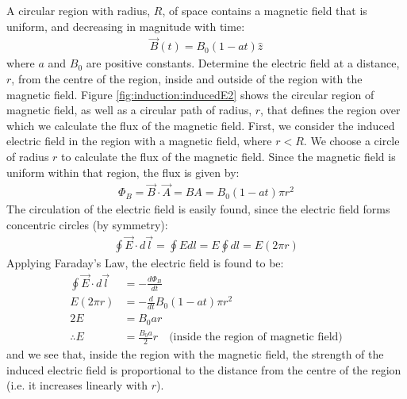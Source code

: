 \begin{example}{A circular region with radius, $R$, of space contains a magnetic field that is uniform, and decreasing in magnitude with time:
\begin{align*}
\vec B(t) = B_0(1-at)\hat z
\end{align*}
where $a$ and $B_0$ are positive constants. Determine the electric field at a distance, $r$, from the centre of the region, inside and outside of the region with the magnetic field.}
Figure \ref{fig:induction:inducedE2} shows the circular region of magnetic field, as well as a circular path of radius, $r$, that defines the region over which we calculate the flux of the magnetic field.
First, we consider the induced electric field in the region with a magnetic field, where $r<R$. We choose a circle of radius $r$ to calculate the flux of the magnetic field. Since the magnetic field is uniform within that region, the flux is given by:
\begin{align*}
\Phi_B = \vec B \cdot \vec A = BA = B_0(1-at) \pi r^2
\end{align*}
The circulation of the electric field is easily found, since the electric field forms concentric circles (by symmetry):
\begin{align*}
\oint \vec E \cdot d\vec l = \oint Edl = E \oint dl = E(2\pi r)
\end{align*}
Applying Faraday's Law, the electric field is found to be:
\begin{align*}
\oint \vec E\cdot d\vec l &= -\frac{d\Phi_B}{dt}\\
E(2\pi r) &= -\frac{d}{dt} B_0(1-at) \pi r^2\\
2E &=  B_0ar\\
\therefore E&=\frac{B_0a}{2}r\quad\text{(inside the region of magnetic field)}
\end{align*}
and we see that, inside the region with the magnetic field, the strength of the induced electric field is proportional to the distance from the centre of the region (i.e. it increases linearly with $r$). 


\end{example}
